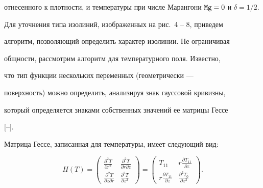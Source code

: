 отнесенного к плотности, и температуры при числе Марангони ${\tt Mg}=0$ и $\delta={1}/{2}.$















Для уточнения типа изолиний, изображенных на рис.~4 -- 8, приведем

алгоритм, позволяющий определить характер изолинии. Не ограничивая

общности, рассмотрим алгоритм для температурного поля. Известно,

что тип функции нескольких переменных (геометрически ---

поверхность) можно определить, анализируя знак гауссовой кривизны,

который определяется знаками собственных значений ее матрицы Гессе

[--].

Матрица Гессе, записанная для температуры, имеет следующий вид:

$$

H(T)= \begin{pmatrix}

        \frac{\partial^{2} T}{\partial

r^{2}} & \frac{\partial^{2} T}{\partial

r \partial z}\\

         \frac{\partial^{2} T}{\partial

z

\partial r} & \frac{\partial^{2} T} {\partial

z^{2}}

 \end{pmatrix}

=

 \begin{pmatrix}

         T_{11} & r\frac{\partial T_{11}}{\partial z}\\

         r\frac{\partial T_{11}}{\partial z} & \frac{\partial^{2} T_0} {\partial z^{2}}

 \end{pmatrix}.

$$







